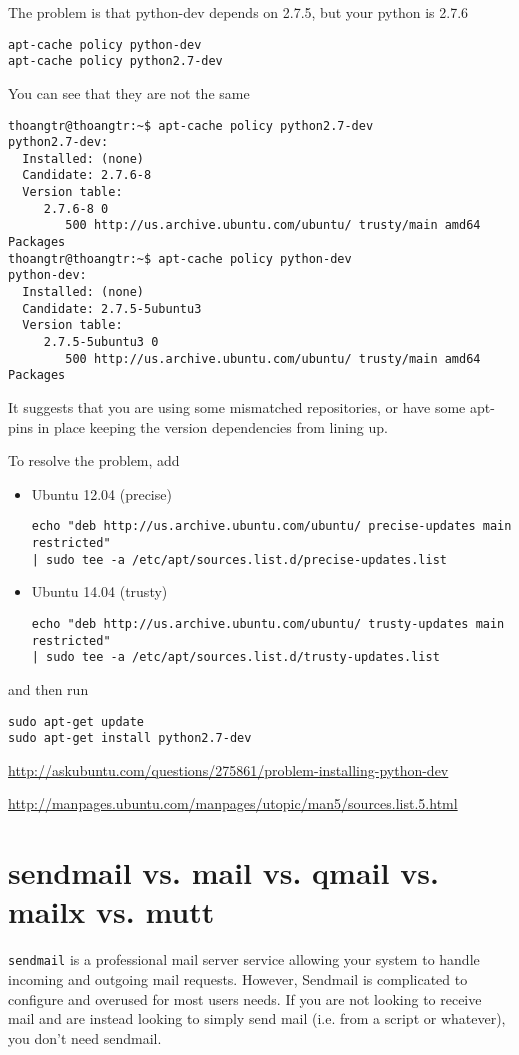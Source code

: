 The problem is that python-dev depends on 2.7.5, but your python is 2.7.6
\begin{verbatim}
apt-cache policy python-dev
apt-cache policy python2.7-dev
\end{verbatim}
You can see that they are not the same
\begin{verbatim}
thoangtr@thoangtr:~$ apt-cache policy python2.7-dev
python2.7-dev:
  Installed: (none)
  Candidate: 2.7.6-8
  Version table:
     2.7.6-8 0
        500 http://us.archive.ubuntu.com/ubuntu/ trusty/main amd64 Packages
thoangtr@thoangtr:~$ apt-cache policy python-dev
python-dev:
  Installed: (none)
  Candidate: 2.7.5-5ubuntu3
  Version table:
     2.7.5-5ubuntu3 0
        500 http://us.archive.ubuntu.com/ubuntu/ trusty/main amd64 Packages
\end{verbatim}
It suggests that you are using some mismatched repositories, or have some
apt-pins in place keeping the version dependencies from lining up.

To resolve the problem, add
\begin{itemize}
  \item Ubuntu 12.04 (precise)
\begin{verbatim}
echo "deb http://us.archive.ubuntu.com/ubuntu/ precise-updates main restricted"
| sudo tee -a /etc/apt/sources.list.d/precise-updates.list
\end{verbatim}

  \item Ubuntu 14.04 (trusty)
\begin{verbatim}
echo "deb http://us.archive.ubuntu.com/ubuntu/ trusty-updates main restricted"
| sudo tee -a /etc/apt/sources.list.d/trusty-updates.list
\end{verbatim}
\end{itemize}
and then run
\begin{verbatim}
sudo apt-get update
sudo apt-get install python2.7-dev
\end{verbatim}
\url{http://askubuntu.com/questions/275861/problem-installing-python-dev}

\url{http://manpages.ubuntu.com/manpages/utopic/man5/sources.list.5.html}

\section{sendmail vs. mail vs. qmail vs. mailx vs. mutt}
\label{sec:sendmail}
\label{sec:mail}
\label{sec:mailx}

\verb!sendmail! is a professional mail server service allowing your system to
handle incoming and outgoing mail requests. However, Sendmail is complicated to
configure and overused for most users needs. If you are not looking to receive
mail and are instead looking to simply send mail (i.e. from a script or
whatever), you don't need sendmail.

